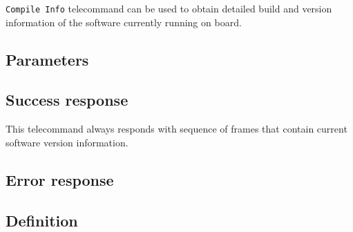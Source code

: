 \texttt{Compile Info} telecommand can be used to obtain detailed build and version information of the software currently running on board.

\subsection{Parameters}
\None

\subsection{Success response}
This telecommand always responds with sequence of  frames that contain current \OBC software version information.

\subsection{Error response}
\None

\subsection{Definition}


